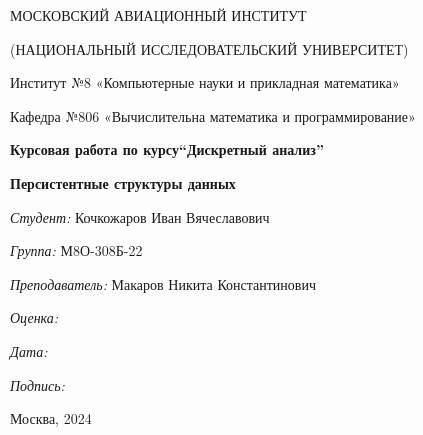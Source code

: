 \documentclass[12pt]{article}
\begin{document}
\thispagestyle{empty}	
\begin{center}
	МОСКОВСКИЙ АВИАЦИОННЫЙ ИНСТИТУТ
	
	(НАЦИОНАЛЬНЫЙ ИССЛЕДОВАТЕЛЬСКИЙ УНИВЕРСИТЕТ)
\vspace{3ex}

	Институт №8 «Компьютерные науки и прикладная математика»
    
	Кафедра №806 «Вычислительна математика и программирование»
	
\end{center}
\vspace{25ex}
\begin{center}
	\textbf{\large{Курсовая работа по курсу\linebreak \textquotedblleft Дискретный анализ\textquotedblright}}
\end{center}
\vspace{3ex}
\begin{center}
    \textbf{\large{Персистентные структуры данных}}
\end{center}
\vspace{20ex}
\begin{flushright}
	\textit{Студент: } Кочкожаров Иван Вячеславович
	
	\vspace{2ex}
	\textit{Группа: } М8О-308Б-22
	
	\vspace{2ex}
	\textit{Преподаватель: } Макаров Никита Константинович 
	
	\vspace{2ex}
	\textit{Оценка: } \underline{\quad\quad\quad\quad\quad\quad}
	
	 \vspace{2ex}
	\textit{Дата: } \underline{\quad\quad\quad\quad\quad\quad}
	
	\vspace{2ex}
	\textit{Подпись: } \underline{\quad\quad\quad\quad\quad\quad}
	
\end{flushright}
\vspace{5ex}

\begin{vfill}
	\begin{center}
		Москва, 2024
	\end{center}	
\end{vfill}
\newpage
\end{document}
